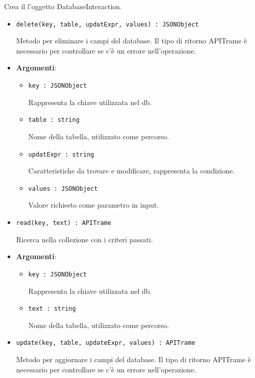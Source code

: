 \documentclass[../DefinizioneDiProdotto.tex]{subfiles}
\begin{document}
\begin{itemize}
\begin{itemize}
\begin{itemize}
	 Crea il l'oggetto DatabaseInteraction.
	\end{itemize}\vspace{0.5em}
	\begin{itemize}
	\item \texttt{delete(key, table, updatExpr, values) : JSONObject}\

	 Metodo per eliminare i campi del database. Il tipo di ritorno APITrame è necessario per controllare se c'è un errore nell'operazione.


	\item \textbf{Argomenti}:
	\begin{itemize}
	\item \texttt{key : JSONObject}\

	 Rappresenta la chiave utilizzata nel db.
	\item \texttt{table : string}\

	 Nome della tabella, utilizzato come percorso.
	\item \texttt{updatExpr : string}\

	 Caratteristiche da trovare e modificare, rappresenta la condizione.
	\item \texttt{values : JSONObject}\

	 Valore richiesto come parametro in input.
	\end{itemize}
	\end{itemize}\vspace{0.5em}
	\begin{itemize}
	\item \texttt{read(key, text) : APITrame}\

	 Ricerca nella collezione con i criteri passati.

	\item \textbf{Argomenti}:
	\begin{itemize}
	\item \texttt{key : JSONObject}\

	 Rappresenta la chiave utilizzata nel db.
	\item \texttt{text : string}\

	 Nome della tabella, utilizzato come percorso.
	\end{itemize}
	\end{itemize}\vspace{0.5em}
	\begin{itemize}
	\item \texttt{update(key, table, updateExpr, values) : APITrame}\

	 Metodo per aggiornare i campi del database. Il tipo di ritorno APITrame è necessario per controllare se c'è un errore nell'operazione.


\end{itemize}
\end{itemize}
\end{itemize}
\end{document}
